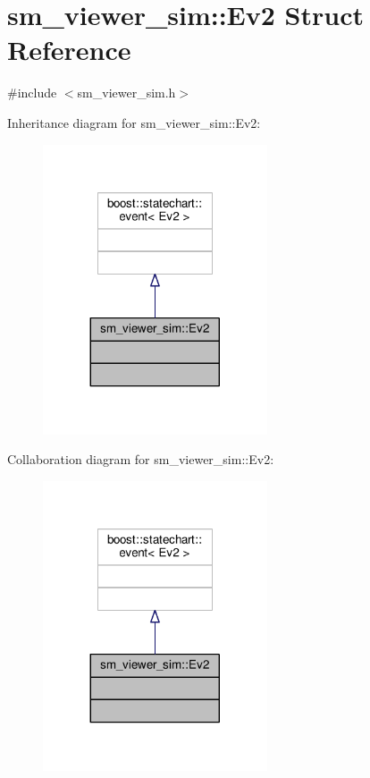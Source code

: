 \hypertarget{structsm__viewer__sim_1_1Ev2}{}\section{sm\+\_\+viewer\+\_\+sim\+:\+:Ev2 Struct Reference}
\label{structsm__viewer__sim_1_1Ev2}


{\ttfamily \#include $<$sm\+\_\+viewer\+\_\+sim.\+h$>$}



Inheritance diagram for sm\+\_\+viewer\+\_\+sim\+:\+:Ev2\+:
\nopagebreak
\begin{figure}[H]
\begin{center}
\leavevmode
\includegraphics[width=188pt]{structsm__viewer__sim_1_1Ev2__inherit__graph}
\end{center}
\end{figure}


Collaboration diagram for sm\+\_\+viewer\+\_\+sim\+:\+:Ev2\+:
\nopagebreak
\begin{figure}[H]
\begin{center}
\leavevmode
\includegraphics[width=188pt]{structsm__viewer__sim_1_1Ev2__coll__graph}
\end{center}
\end{figure}


